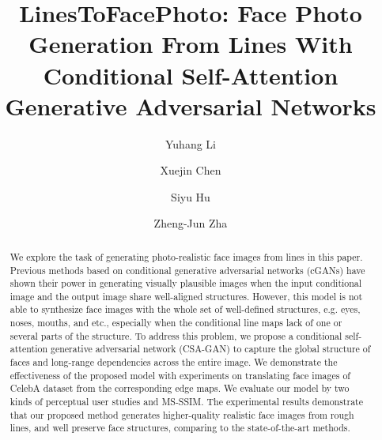 \documentclass[format=acmsmall, review=false, screen=true]{acmart}
\newcommand{\comments}[1]{}
\begin{document}
\title[LinesToFacePhoto]{LinesToFacePhoto: Face Photo Generation From Lines With Conditional Self-Attention Generative Adversarial Networks}

\author{Yuhang Li}
%
%
\author{Xuejin Chen}
%
%
\author{Siyu Hu}
%
%
\author{Zheng-Jun Zha}
%
%
\comments{\author{Sing Bing Kang}
\affiliation{%
	\institution{Microsoft Research}
	\streetaddress{One Microsoft Way}
	\city{Redmond}
	\state{WA}
	\postcode{98052}
	\country{USA}
}
\email{SingBing.Kang@microsoft.com}}

\begin{abstract}
We explore the task of generating photo-realistic face images from lines in this paper.
Previous methods based on conditional generative adversarial networks (cGANs) have shown their power in generating visually plausible images when the input conditional image and the output image share well-aligned structures. 
However, this model is not able to synthesize face images with the whole set of well-defined structures, e.g. eyes, noses, mouths, and etc., especially when the conditional line maps lack of one or several parts of the structure. 
%
To address this problem, we propose a conditional self-attention generative adversarial network (CSA-GAN) to capture the global structure of faces and long-range dependencies across the entire image. 
We demonstrate the effectiveness of the proposed model with experiments on translating face images of CelebA dataset from the corresponding edge maps. 
We evaluate our model by two kinds of perceptual user studies and MS-SSIM.
The experimental results demonstrate that our proposed method generates higher-quality realistic face images from rough lines, and well preserve face structures, comparing to the state-of-the-art methods.
\end{abstract}
\end{document}
